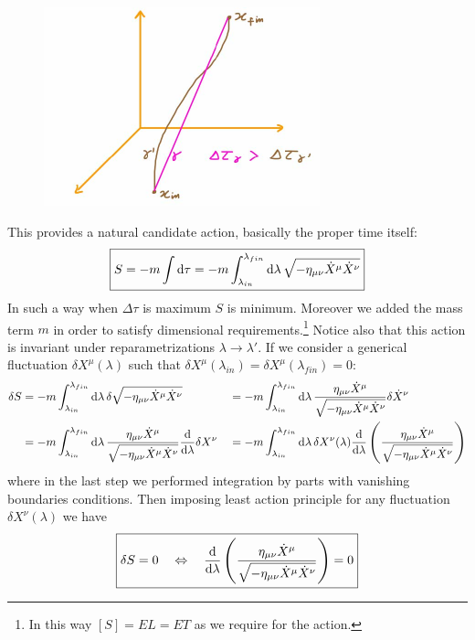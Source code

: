 \documentclass[../main/main.tex]{subfiles}
\begin{document}
\begin{figure}[H]
\centering
\includegraphics[width=8cm]{../img/trajectories-least-action.jpg}
\end{figure}
\noindent
This provides a natural candidate action, basically the proper time itself:
\begin{equation}\label{eqn:action-massice-part}
\boxed{
S=-m\int\textup{d}\tau=-m\int_{\lambda_{in}}^{\lambda_{fin}}\textup{d}\lambda\,\sqrt{-\eta_{\mu\nu}\dot X^\mu\dot X^\nu}
}
\end{equation}
In such a way when $\Delta \tau$ is maximum $S$ is minimum. Moreover we added the mass term $m$ in order to satisfy dimensional requirements.\footnote{In this way $[S]=EL=ET$ as we require for the action.} Notice also that this action is invariant under reparametrizations $\lambda\to\lambda'$.
If we consider a generical fluctuation $\delta X^\mu(\lambda)$ such that $\delta X^\mu(\lambda_{in})=\delta X^\mu(\lambda_{fin})=0$:
\begin{alignat*}{3}
\delta S
&=-m\int_{\lambda_{in}}^{\lambda_{fin}}\textup{d}\lambda\,\delta\sqrt{-\eta_{\mu\nu}\dot X^\mu\dot X^\nu}
&&=-m\int_{\lambda_{in}}^{\lambda_{fin}}\textup{d}\lambda\,\frac{\eta_{\mu\nu}\dot X^\mu}{\sqrt{-\eta_{\mu\nu}\dot X^\mu\dot X^\nu}}\delta\dot X^\nu\\
&=-m\int_{\lambda_{in}}^{\lambda_{fin}}\textup{d}\lambda\,\frac{\eta_{\mu\nu}\dot X^\mu}{\sqrt{-\eta_{\mu\nu}\dot X^\mu\dot X^\nu}}\frac{\textup{d}}{\textup{d}\lambda}\delta X^\nu
&&=-m\int_{\lambda_{in}}^{\lambda_{fin}}\textup{d}\lambda\,\delta X^\nu(\lambda)\frac{\textup{d}}{\textup{d}\lambda}\left(\frac{\eta_{\mu\nu}\dot X^\mu}{\sqrt{-\eta_{\mu\nu}\dot X^\mu\dot X^\nu}}\right)
\end{alignat*}
where in the last step we performed integration by parts with vanishing boundaries conditions. Then imposing least action principle for any fluctuation $\delta X^\nu(\lambda)$ we have
\begin{equation}
\boxed{
\delta S=0\quad\Leftrightarrow\quad\frac{\textup{d}}{\textup{d}\lambda}\left(\frac{\eta_{\mu\nu}\dot X^\mu}{\sqrt{-\eta_{\mu\nu}\dot X^\mu\dot X^\nu}}\right)=0
}
\end{equation}
\end{document}
